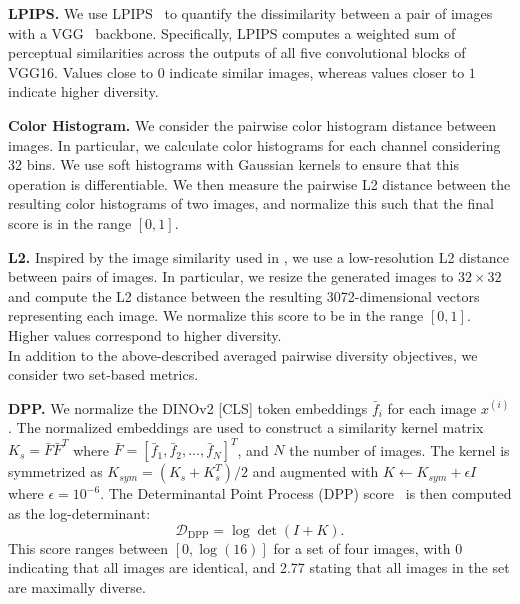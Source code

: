 \documentclass[10pt,twocolumn,letterpaper]{article}
\begin{document}
\noindent \textbf{LPIPS.} We use LPIPS~\cite{lpips} to quantify the dissimilarity between a pair of images with a VGG~\cite{simonyan2014very} backbone. Specifically, LPIPS computes a weighted sum of perceptual similarities across the outputs of all five convolutional blocks of VGG16. Values close to $0$ indicate similar images, whereas values closer to $1$ indicate higher diversity.

\noindent \textbf{Color Histogram.} We consider the pairwise color histogram distance between images. In particular, we calculate color histograms for each channel considering 32 bins. We use soft histograms with Gaussian kernels to ensure that this operation is differentiable. We then measure the pairwise L2 distance between the resulting color histograms of two images, and normalize this such that the final score is in the range $[0,1]$. 


\noindent \textbf{L2.} Inspired by the image similarity used in \cite{torralba200880}, we use a low-resolution L2 distance between pairs of images. In particular, we resize the generated images to $32 \times 32$ and compute the L2 distance between the resulting 3072-dimensional vectors representing each image. We normalize this score to be in the range $[0,1]$. Higher values correspond to higher diversity. \\

In addition to the above-described averaged pairwise diversity objectives, we consider two set-based metrics.

\noindent \textbf{DPP.} 
We normalize the DINOv2 [CLS] token embeddings $\bar{f}_i$ for each image $x^{(i)}$. The normalized embeddings are used to construct a similarity kernel matrix $K_{s} = \bar{F} \bar{F}^T$ where $\bar{F} = [\bar{f}_1, \bar{f}_2, \ldots, \bar{f}_N]^T$, and $N$ the number of images. The kernel is symmetrized as $K_{sym} = (K_{s} + K_{s}^T)/2$ and augmented with $K \leftarrow K_{sym} + \epsilon I$ where $\epsilon = 10^{-6}$. The Determinantal Point Process (DPP) score~\cite{kulesza2012determinantal} is then computed as the log-determinant:
\begin{equation}
\mathcal{D}_{\text{DPP}} = \log \det(I + K).
\end{equation}
This score ranges between  $[0,\log(16)]$ for a set of four images, with $0$ indicating that all images are identical, and 2.77 stating that all images in the set are maximally diverse. 
\end{document}
